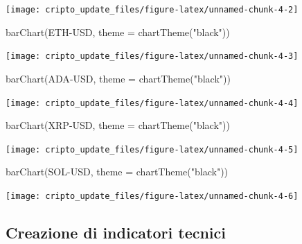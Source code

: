 \documentclass[]{tufte-handout}
\newenvironment{Shaded}{}{}
\newcommand{\AttributeTok}[1]{\textcolor[rgb]{0.49,0.56,0.16}{#1}}
\newcommand{\FunctionTok}[1]{\textcolor[rgb]{0.02,0.16,0.49}{#1}}
\newcommand{\NormalTok}[1]{#1}
\newcommand{\StringTok}[1]{\textcolor[rgb]{0.25,0.44,0.63}{#1}}
\begin{document}
\texttt{[image: cripto\_update\_files/figure-latex/unnamed-chunk-4-2]}

\begin{Shaded}
\begin{Highlighting}[]
\FunctionTok{barChart}\NormalTok{(}\StringTok{\textasciigrave{}}\AttributeTok{ETH{-}USD}\StringTok{\textasciigrave{}}\NormalTok{, }\AttributeTok{theme =} \FunctionTok{chartTheme}\NormalTok{(}\StringTok{"black"}\NormalTok{))}
\end{Highlighting}
\end{Shaded}

\texttt{[image: cripto\_update\_files/figure-latex/unnamed-chunk-4-3]}

\begin{Shaded}
\begin{Highlighting}[]
\FunctionTok{barChart}\NormalTok{(}\StringTok{\textasciigrave{}}\AttributeTok{ADA{-}USD}\StringTok{\textasciigrave{}}\NormalTok{, }\AttributeTok{theme =} \FunctionTok{chartTheme}\NormalTok{(}\StringTok{"black"}\NormalTok{))}
\end{Highlighting}
\end{Shaded}

\texttt{[image: cripto\_update\_files/figure-latex/unnamed-chunk-4-4]}

\begin{Shaded}
\begin{Highlighting}[]
\FunctionTok{barChart}\NormalTok{(}\StringTok{\textasciigrave{}}\AttributeTok{XRP{-}USD}\StringTok{\textasciigrave{}}\NormalTok{, }\AttributeTok{theme =} \FunctionTok{chartTheme}\NormalTok{(}\StringTok{"black"}\NormalTok{))}
\end{Highlighting}
\end{Shaded}

\texttt{[image: cripto\_update\_files/figure-latex/unnamed-chunk-4-5]}

\begin{Shaded}
\begin{Highlighting}[]
\FunctionTok{barChart}\NormalTok{(}\StringTok{\textasciigrave{}}\AttributeTok{SOL{-}USD}\StringTok{\textasciigrave{}}\NormalTok{, }\AttributeTok{theme =} \FunctionTok{chartTheme}\NormalTok{(}\StringTok{"black"}\NormalTok{))}
\end{Highlighting}
\end{Shaded}

\texttt{[image: cripto\_update\_files/figure-latex/unnamed-chunk-4-6]}

\hypertarget{creazione-di-indicatori-tecnici}{%
\subsection{Creazione di indicatori
tecnici}\label{creazione-di-indicatori-tecnici}}
\end{document}
